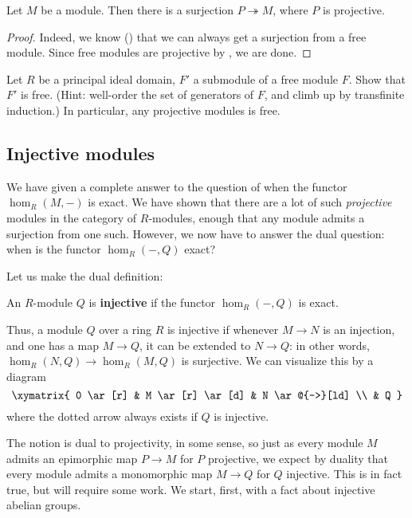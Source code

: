 \begin{corollary}
Let $M$ be a module. Then there is a surjection $P \twoheadrightarrow M$,
where $P$ is projective.
\end{corollary}
\begin{proof}
Indeed, we know () that we can always get a surjection
from a free
module. Since free modules are projective by , we are
done.
\end{proof}

\begin{exercise}
Let $R$ be a principal ideal domain, $F'$ a submodule of a free module
$F$. Show that
$F'$ is free. (Hint: well-order the set of generators of $F$, and climb up by
transfinite induction.)
In particular, any projective modules is free.
\end{exercise}

\subsection{Injective modules}
\label{ssecinj}

We have given a complete answer to the question of when the functor
$\hom_R(M,-)$ is exact. We have shown that there are a lot of such
\emph{projective} modules in the category of $R$-modules, enough that any
module admits a surjection from one such.
However, we now have to answer the dual question: when is the functor
$\hom_R(-, Q)$ exact?

Let us make the dual definition:

\begin{definition}
An $R$-module $Q$ is \textbf{injective} if the functor $\hom_R(-,Q)$ is exact.
\end{definition}


Thus, a module $Q$ over a ring $R$ is injective if
whenever $M \to N$ is an injection, and one has a map $M \to Q$, it can be
extended to $N \to Q$: in other words, $\hom_R(N,Q ) \to \hom_R(M,Q)$ is
surjective.
We can visualize this by a diagram
\[ \xymatrix{
0 \ar[r] &  M \ar[r] \ar[d]  &  N \ar@{-->}[ld] \\
& Q
}\]
where the dotted arrow always exists if $Q$ is injective.

The notion is dual to projectivity, in some sense, so just as every module $M$
admits an epimorphic map $P \to M$ for $P$ projective, we expect by duality
that every module admits a monomorphic map $M \to Q$ for $Q$ injective.
This is in fact true, but will require some work.
We start, first, with a fact about injective abelian groups.

